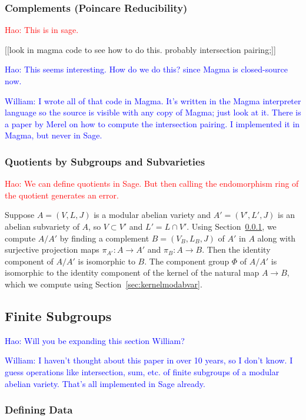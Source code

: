 \documentclass{article}
\newcommand{\Hao}[1]{\textcolor{blue}{\textsf{Hao: #1}}}
\newcommand{\wstein}[1]{\textcolor{blue}{\textsf{William: #1}}}
\newcommand{\Haonew}[1]{\textcolor{red}{\textsf{Hao: #1}}}
\begin{document}
\subsubsection{Complements (Poincare Reducibility)}\label{sec:poincare}


\Haonew{This is in sage.}

[[look in magma code to see how to do this.  probably intersection
pairing;]]

\Hao{This seems interesting. How do we do this? since Magma is closed-source now.}

\wstein{I wrote all of that code in Magma.  It's written in the Magma interpreter language so the source is visible with any copy of Magma; just
look at it.  There is a paper by Merel on how to compute the
intersection pairing.  I implemented it in Magma, but never in Sage.}

\subsubsection{Quotients by Subgroups and Subvarieties}

\Haonew{We can define quotients in Sage. But then calling the endomorphism ring of the quotient generates an error.}

Suppose $A = (V, L, J)$ is a modular abelian variety and $A' = (V',
L', J)$ is an abelian subvariety of $A$, so $V\subset V'$ and $L' =
L\cap V'$.  Using Section~\ref{sec:poincare}, we compute $A/A'$ by
finding a complement $B=(V_B,L_B,J)$ of $A'$ in $A$ along with
surjective projection maps $\pi_{A'}: A \to A'$ and $\pi_B: A\to B$.
Then the identity component of $A/A'$ is isomorphic to $B$.  The
component group $\Phi$ of $A/A'$ is isomorphic to the identity
component of the kernel of the natural map $A \to B$, which we compute
using Section~\ref{sec:kernelmodabvar}.

\subsection{Finite Subgroups}

\Hao{Will you be expanding this section William?}

\wstein{I haven't thought about this paper in over 10 years,
so I don't know.  I guess operations like intersection, sum, etc.
of finite subgroups of a modular abelian variety. That's all implemented
in Sage already.}

\subsubsection{Defining Data}
\end{document}
